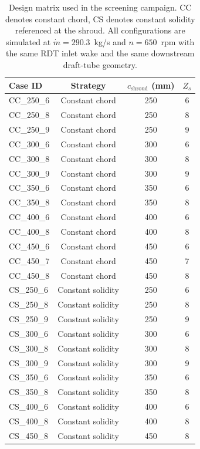\begin{table}[h!]
  \centering
  \caption[24-case design matrix]{Design matrix used in the screening campaign. CC denotes constant chord, CS denotes constant solidity referenced at the shroud. All configurations are simulated at $\dot m = 290.3$~kg/s and $n = 650$~rpm with the same RDT inlet wake and the same downstream draft-tube geometry.}
  \label{tab:design_matrix}
  \small
  \begin{tabular}{l|c|c|c}
    \toprule
    \textbf{Case ID} & \textbf{Strategy} & $c_{\mathrm{shroud}}$ (mm) & $Z_s$ \\
    \midrule
    CC\_250\_6  & Constant chord    & 250 & 6 \\
    CC\_250\_8  & Constant chord    & 250 & 8 \\
    CC\_250\_9  & Constant chord    & 250 & 9 \\
    CC\_300\_6  & Constant chord    & 300 & 6 \\
    CC\_300\_8  & Constant chord    & 300 & 8 \\
    CC\_300\_9  & Constant chord    & 300 & 9 \\
    CC\_350\_6  & Constant chord    & 350 & 6 \\
    CC\_350\_8  & Constant chord    & 350 & 8 \\
    CC\_400\_6  & Constant chord    & 400 & 6 \\
    CC\_400\_8  & Constant chord    & 400 & 8 \\
    CC\_450\_6  & Constant chord    & 450 & 6 \\
    CC\_450\_7  & Constant chord    & 450 & 7 \\
    CC\_450\_8  & Constant chord    & 450 & 8 \\
    \midrule
    CS\_250\_6  & Constant solidity & 250 & 6 \\
    CS\_250\_8  & Constant solidity & 250 & 8 \\
    CS\_250\_9  & Constant solidity & 250 & 9 \\
    CS\_300\_6  & Constant solidity & 300 & 6 \\
    CS\_300\_8  & Constant solidity & 300 & 8 \\
    CS\_300\_9  & Constant solidity & 300 & 9 \\
    CS\_350\_6  & Constant solidity & 350 & 6 \\
    CS\_350\_8  & Constant solidity & 350 & 8 \\
    CS\_400\_6  & Constant solidity & 400 & 6 \\
    CS\_400\_8  & Constant solidity & 400 & 8 \\
    CS\_450\_8  & Constant solidity & 450 & 8 \\
    \bottomrule
  \end{tabular}
\end{table}
 
